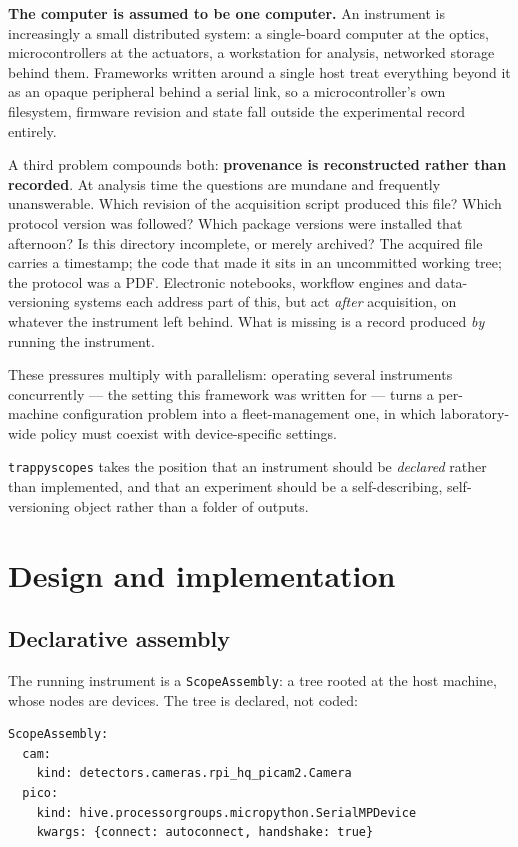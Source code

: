 \documentclass[10pt,a4paper,twocolumn]{article}
\begin{document}
\textbf{The computer is assumed to be one computer.} An instrument is increasingly a
small distributed system: a single-board computer at the optics, microcontrollers at
the actuators, a workstation for analysis, networked storage behind them. Frameworks
written around a single host treat everything beyond it as an opaque peripheral
behind a serial link, so a microcontroller's own filesystem, firmware revision and
state fall outside the experimental record entirely.

A third problem compounds both: \textbf{provenance is reconstructed rather than
recorded}. At analysis time the questions are mundane and frequently
unanswerable. Which revision of the acquisition script produced this file? Which
protocol version was followed? Which package versions were installed that afternoon?
Is this directory incomplete, or merely archived? The acquired file carries a
timestamp; the code that made it sits in an uncommitted working tree; the protocol was
a PDF. Electronic notebooks, workflow engines and data-versioning systems each address
part of this, but act \emph{after} acquisition, on whatever the instrument left
behind. What is missing is a record produced \emph{by} running the instrument.

These pressures multiply with parallelism: operating several instruments concurrently
--- the setting this framework was written for --- turns a per-machine configuration
problem into a fleet-management one, in which laboratory-wide policy must coexist with
device-specific settings.

\texttt{trappyscopes} takes the position that an instrument should be \emph{declared}
rather than implemented, and that an experiment should be a self-describing,
self-versioning object rather than a folder of outputs.

\section{Design and implementation}

\subsection{Declarative assembly}
The running instrument is a \texttt{ScopeAssembly}: a tree rooted at the host
machine, whose nodes are devices. The tree is declared, not coded:

\begin{lstlisting}[language=bash]
ScopeAssembly:
  cam:
    kind: detectors.cameras.rpi_hq_picam2.Camera
  pico:
    kind: hive.processorgroups.micropython.SerialMPDevice
    kwargs: {connect: autoconnect, handshake: true}
\end{lstlisting}
\end{document}
